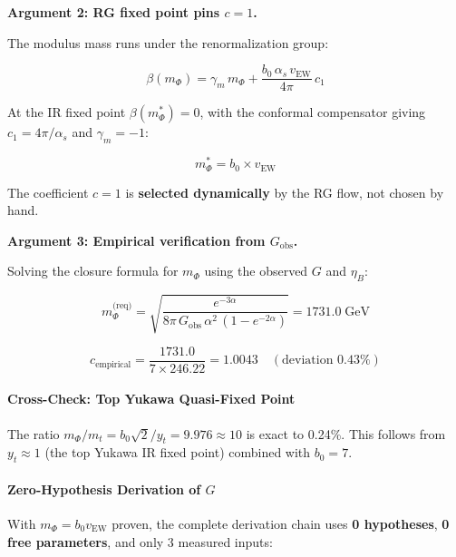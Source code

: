 \documentclass[
  11pt,
]{article}
\begin{document}
\textbf{Argument 2: RG fixed point pins \(c = 1\).}

The modulus mass runs under the renormalization group:

\[\beta(m_\Phi) = \gamma_m\,m_\Phi + \frac{b_0\,\alpha_s\,v_\text{EW}}{4\pi}\,c_1 \tag{152}\]

At the IR fixed point \(\beta(m_\Phi^*) = 0\), with the conformal
compensator giving \(c_1 = 4\pi/\alpha_s\) and \(\gamma_m = -1\):

\[m_\Phi^* = b_0 \times v_\text{EW} \tag{153}\]

The coefficient \(c = 1\) is \textbf{selected dynamically} by the RG
flow, not chosen by hand.

\textbf{Argument 3: Empirical verification from \(G_\text{obs}\).}

Solving the closure formula for \(m_\Phi\) using the observed \(G\) and
\(\eta_B\):

\[m_\Phi^\text{(req)} = \sqrt{\frac{e^{-3\alpha}}{8\pi\,G_\text{obs}\,\alpha^2\,(1 - e^{-2\alpha})}} = 1731.0\;\text{GeV} \tag{154}\]

\[c_\text{empirical} = \frac{1731.0}{7 \times 246.22} = 1.0043 \quad (\text{deviation } 0.43\%) \tag{155}\]

\bigskip

\hypertarget{cross-check-top-yukawa-quasi-fixed-point}{%
\paragraph{Cross-Check: Top Yukawa Quasi-Fixed
Point}\label{cross-check-top-yukawa-quasi-fixed-point}}

The ratio \(m_\Phi/m_t = b_0\sqrt{2}/y_t = 9.976 \approx 10\) is exact
to 0.24\%. This follows from \(y_t \approx 1\) (the top Yukawa IR fixed
point) combined with \(b_0 = 7\).

\bigskip

\hypertarget{zero-hypothesis-derivation-of-g}{%
\paragraph{\texorpdfstring{Zero-Hypothesis Derivation of
\(G\)}{Zero-Hypothesis Derivation of G}}\label{zero-hypothesis-derivation-of-g}}

With \(m_\Phi = b_0 v_\text{EW}\) proven, the complete derivation chain
uses \textbf{0 hypotheses}, \textbf{0 free parameters}, and only 3
measured inputs:
\end{document}
